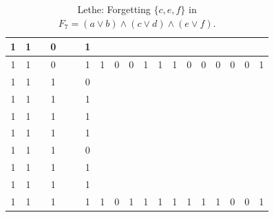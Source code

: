 \begin{table}[!tb]
\begin{tabular}{|c|c|c|c|c|c|c|c|c|c|c|c|c|c|c|c|c|c|c|}
        \rowcolor{blue!40} 1 & 1 &  & 0 &  &  & 1 &  &  &  &  &  &  &  &  &  &  &  &  \\ \hline
        \rowcolor{blue!40} 1 & 1 &  & 0 &  &  & 1 & 1 & 0 & 0 & 1 & 1 & 1 & 0 & 0 & 0 & 0 & 0 & 1 \\ \hline
        \rowcolor{red!40} 1 & 1 &  & 1 &  &  & 0 &  &  &  &  &  &  &  &  &  &  &  &  \\ \hline
        \rowcolor{red!40} 1 & 1 &  & 1 &  &  & 1 &  &  &  &  &  &  &  &  &  &  &  &  \\ \hline
        \rowcolor{red!40} 1 & 1 &  & 1 &  &  & 1 &  &  &  &  &  &  &  &  &  &  &  &  \\ \hline
        \rowcolor{red!40} 1 & 1 &  & 1 &  &  & 1 &  &  &  &  &  &  &  &  &  &  &  &  \\ \hline
        \rowcolor{red!40} 1 & 1 &  & 1 &  &  & 0 &  &  &  &  &  &  &  &  &  &  &  &  \\ \hline
        \rowcolor{red!40} 1 & 1 &  & 1 &  &  & 1 &  &  &  &  &  &  &  &  &  &  &  &  \\ \hline
        \rowcolor{red!40} 1 & 1 &  & 1 &  &  & 1 &  &  &  &  &  &  &  &  &  &  &  &  \\ \hline
        \rowcolor{red!40} 1 & 1 &  & 1 &  &  & 1 & 1 & 0 & 1 & 1 & 1 & 1 & 1 & 1 & 1 & 0 & 0 & 1 \\ \hline
    \end{tabular}
    \caption{Lethe: Forgetting $\{c, e, f\}$ in $F_{7} = (a \lor b) \land (c \lor d) \land (e \lor f)$.}
    \label{tab:lethe-F7-cef}
\end{table}
